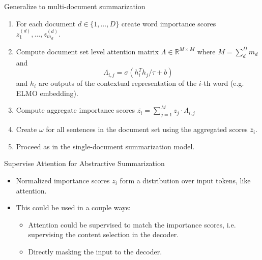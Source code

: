 \begin{frame}{Generalize to multi-document summarization}
\begin{enumerate}
\item For each document $d \in \{1, \ldots, D\}$ create word importance 
scores  $z_1^{(d)}, \ldots, z_{m_d}^{(d)}$.
\item Compute document set level attention matrix 
    $\Lambda \in \mathbb{R}^{M \times M}$ where $M = \sum_d^D m_d$ and 
\[ \Lambda_{i,j} = \sigma(h_i^Th_j / \tau + b)   \] and $h_i$ are outputs
 of the contextual representation of the $i$-th word (e.g. ELMO embedding).
\item Compute aggregate importance scores $\bar{z_i} = \sum_{j=1}^M z_j \cdot \Lambda_{i, j}$ 
\item Create $\omega$ for all sentences in the document set using the aggregated scores  $\bar{z}_i$. 
\item Proceed as in the single-document summarization model.
\end{enumerate}
\end{frame}

\begin{frame}{Supervise Attention for Abstractive Summarization}

    \begin{itemize}
        \item Normalized importance scores $z_i$ form a distribution over 
            input tokens, like attention.
        \item This could be used in a couple ways:
            \begin{itemize}
                \item Attention could be supervised to match the importance
                    scores, i.e. supervising the content selection in the 
                    decoder.
                \item Directly masking the input to the decoder.
            \end{itemize}
    \end{itemize}

\end{frame}
